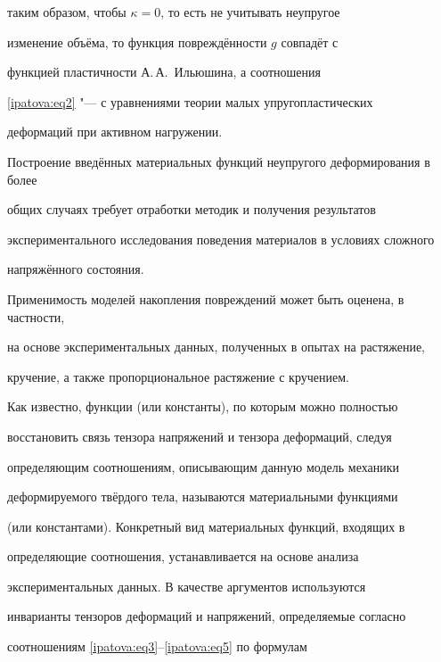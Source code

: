 таким образом, чтобы $\kappa =0$, то есть не учитывать неупругое

изменение объёма, то функция повреждённости $g$ совпадёт с

функцией пластичности А.\,А.~Ильюшина, а соотношения

\eqref{ipatova:eq2} "--- с уравнениями теории малых упругопластических

деформаций при активном нагружении.



Построение введённых материальных функций неупругого деформирования в более

общих случаях требует отработки методик и получения результатов

экспериментального исследования поведения материалов в условиях сложного

напряжённого состояния.



Применимость моделей накопления повреждений может быть оценена, в частности,

на основе экспериментальных данных, полученных в опытах на растяжение,

кручение, а также пропорциональное растяжение с кручением.



Как известно, функции (или константы), по которым можно полностью

восстановить связь тензора напряжений и тензора деформаций, следуя

определяющим соотношениям, описывающим данную модель механики

деформируемого твёрдого тела, называются материальными функциями

(или константами). Конкретный вид материальных функций, входящих в

определяющие соотношения, устанавливается на основе анализа

экспериментальных данных. В качестве аргументов используются

инварианты тензоров деформаций и напряжений, определяемые согласно

соотношениям \eqref{ipatova:eq3}--\eqref{ipatova:eq5} по формулам

